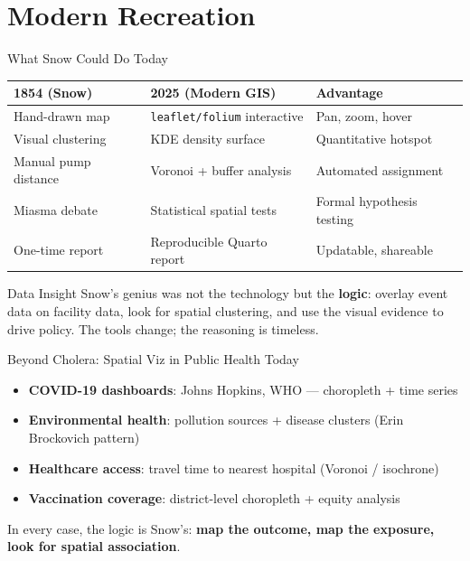 \documentclass[10pt]{beamer}
\begin{document}
\section{Modern Recreation}
\begin{frame}{What Snow Could Do Today}
\centering
\begin{tabular}{lll}
\toprule
\textbf{1854 (Snow)} & \textbf{2025 (Modern GIS)} & \textbf{Advantage} \\
\midrule
Hand-drawn map & \texttt{leaflet/folium} interactive & Pan, zoom, hover \\
Visual clustering & KDE density surface & Quantitative hotspot \\
Manual pump distance & Voronoi + buffer analysis & Automated assignment \\
Miasma debate & Statistical spatial tests & Formal hypothesis testing \\
One-time report & Reproducible Quarto report & Updatable, shareable \\
\bottomrule
\end{tabular}
\vspace{6pt}
\begin{exampleblock}{Data Insight}
Snow's genius was not the technology but the \textbf{logic}: overlay event data on facility data, look for spatial clustering, and use the visual evidence to drive policy. The tools change; the reasoning is timeless.
\end{exampleblock}
\end{frame}
\begin{frame}{Beyond Cholera: Spatial Viz in Public Health Today}
\begin{itemize}
\item \textbf{COVID-19 dashboards}: Johns Hopkins, WHO --- choropleth + time series
\item \textbf{Environmental health}: pollution sources + disease clusters (Erin Brockovich pattern)
\item \textbf{Healthcare access}: travel time to nearest hospital (Voronoi / isochrone)
\item \textbf{Vaccination coverage}: district-level choropleth + equity analysis
\end{itemize}
\vspace{6pt}
In every case, the logic is Snow's: \textbf{map the outcome, map the exposure, look for spatial association}.
\end{frame}
\end{document}
